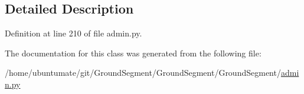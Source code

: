 \subsection{Detailed Description}


Definition at line 210 of file admin.\+py.



The documentation for this class was generated from the following file\+:\begin{DoxyCompactItemize}
\item 
/home/ubuntumate/git/\+Ground\+Segment/\+Ground\+Segment/\+Ground\+Segment/\hyperlink{admin_8py}{admin.\+py}\end{DoxyCompactItemize}
